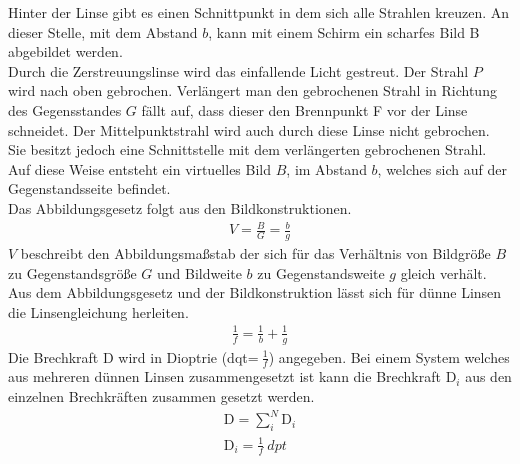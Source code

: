 Hinter der Linse gibt es einen Schnittpunkt in dem sich alle Strahlen kreuzen. An dieser Stelle, mit dem Abstand $b$, kann mit einem Schirm ein scharfes Bild B abgebildet werden.
\\Durch die Zerstreuungslinse wird das einfallende Licht gestreut. Der Strahl $P$ wird nach oben gebrochen.
Verlängert man den gebrochenen Strahl in Richtung des Gegensstandes $G$ fällt auf, dass dieser den Brennpunkt F vor der Linse schneidet.
Der Mittelpunktstrahl wird auch durch diese Linse nicht gebrochen. Sie besitzt jedoch eine Schnittstelle mit dem verlängerten gebrochenen Strahl.
Auf diese Weise entsteht ein virtuelles Bild $B$, im Abstand $b$, welches sich auf der Gegenstandsseite befindet.
\\Das Abbildungsgesetz folgt aus den Bildkonstruktionen.
\begin{align}
  V=\frac{B}{G}=\frac{b}{g}
  \label{eqn:maßstab}
\end{align}
$V$ beschreibt den Abbildungsmaßstab der sich für das Verhältnis von Bildgröße $B$ zu Gegenstandsgröße $G$ und Bildweite $b$ zu Gegenstandsweite $g$ gleich verhält.
Aus dem Abbildungsgesetz und der Bildkonstruktion lässt sich für dünne Linsen die Linsengleichung herleiten.
\begin{align}
  \frac{1}{f}=\frac{1}{b}+\frac{1}{g}
  \label{eqn:linse}
\end{align}
Die Brechkraft D wird in Dioptrie (dqt=$\SI{}{\frac{1}{f}}$) angegeben.
Bei einem System welches aus mehreren dünnen Linsen zusammengesetzt ist kann die Brechkraft $\text{D}_i$ aus den einzelnen Brechkräften zusammen gesetzt werden.
\begin{align*}
  \text{D}=\sum_{i}^{N}{\text{D}_i}\\
  \text{D}_i=\frac{1}{f}\SI{}{dpt}
\end{align*}
